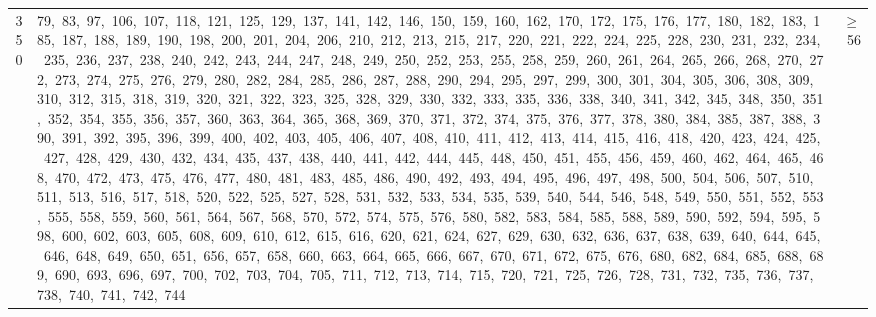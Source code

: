 \begin{longtable}{c|p{}|r}
350 & 79,\ 83,\ 97,\ 106,\ 107,\ 118,\ 121,\ 125,\ 129,\ 137,\ 141,\ 142,\ 146,\ 150,\ 159,\ 160,\ 162,\ 170,\ 172,\ 175,\ 176,\ 177,\ 180,\ 182,\ 183,\ 185,\ 187,\ 188,\ 189,\ 190,\ 198,\ 200,\ 201,\ 204,\ 206,\ 210,\ 212,\ 213,\ 215,\ 217,\ 220,\ 221,\ 222,\ 224,\ 225,\ 228,\ 230,\ 231,\ 232,\ 234,\ 235,\ 236,\ 237,\ 238,\ 240,\ 242,\ 243,\ 244,\ 247,\ 248,\ 249,\ 250,\ 252,\ 253,\ 255,\ 258,\ 259,\ 260,\ 261,\ 264,\ 265,\ 266,\ 268,\ 270,\ 272,\ 273,\ 274,\ 275,\ 276,\ 279,\ 280,\ 282,\ 284,\ 285,\ 286,\ 287,\ 288,\ 290,\ 294,\ 295,\ 297,\ 299,\ 300,\ 301,\ 304,\ 305,\ 306,\ 308,\ 309,\ 310,\ 312,\ 315,\ 318,\ 319,\ 320,\ 321,\ 322,\ 323,\ 325,\ 328,\ 329,\ 330,\ 332,\ 333,\ 335,\ 336,\ 338,\ 340,\ 341,\ 342,\ 345,\ 348,\ 350,\ 351,\ 352,\ 354,\ 355,\ 356,\ 357,\ 360,\ 363,\ 364,\ 365,\ 368,\ 369,\ 370,\ 371,\ 372,\ 374,\ 375,\ 376,\ 377,\ 378,\ 380,\ 384,\ 385,\ 387,\ 388,\ 390,\ 391,\ 392,\ 395,\ 396,\ 399,\ 400,\ 402,\ 403,\ 405,\ 406,\ 407,\ 408,\ 410,\ 411,\ 412,\ 413,\ 414,\ 415,\ 416,\ 418,\ 420,\ 423,\ 424,\ 425,\ 427,\ 428,\ 429,\ 430,\ 432,\ 434,\ 435,\ 437,\ 438,\ 440,\ 441,\ 442,\ 444,\ 445,\ 448,\ 450,\ 451,\ 455,\ 456,\ 459,\ 460,\ 462,\ 464,\ 465,\ 468,\ 470,\ 472,\ 473,\ 475,\ 476,\ 477,\ 480,\ 481,\ 483,\ 485,\ 486,\ 490,\ 492,\ 493,\ 494,\ 495,\ 496,\ 497,\ 498,\ 500,\ 504,\ 506,\ 507,\ 510,\ 511,\ 513,\ 516,\ 517,\ 518,\ 520,\ 522,\ 525,\ 527,\ 528,\ 531,\ 532,\ 533,\ 534,\ 535,\ 539,\ 540,\ 544,\ 546,\ 548,\ 549,\ 550,\ 551,\ 552,\ 553,\ 555,\ 558,\ 559,\ 560,\ 561,\ 564,\ 567,\ 568,\ 570,\ 572,\ 574,\ 575,\ 576,\ 580,\ 582,\ 583,\ 584,\ 585,\ 588,\ 589,\ 590,\ 592,\ 594,\ 595,\ 598,\ 600,\ 602,\ 603,\ 605,\ 608,\ 609,\ 610,\ 612,\ 615,\ 616,\ 620,\ 621,\ 624,\ 627,\ 629,\ 630,\ 632,\ 636,\ 637,\ 638,\ 639,\ 640,\ 644,\ 645,\ 646,\ 648,\ 649,\ 650,\ 651,\ 656,\ 657,\ 658,\ 660,\ 663,\ 664,\ 665,\ 666,\ 667,\ 670,\ 671,\ 672,\ 675,\ 676,\ 680,\ 682,\ 684,\ 685,\ 688,\ 689,\ 690,\ 693,\ 696,\ 697,\ 700,\ 702,\ 703,\ 704,\ 705,\ 711,\ 712,\ 713,\ 714,\ 715,\ 720,\ 721,\ 725,\ 726,\ 728,\ 731,\ 732,\ 735,\ 736,\ 737,\ 738,\ 740,\ 741,\ 742,\ 744 & $\ge$ 56 \\

\end{longtable}
